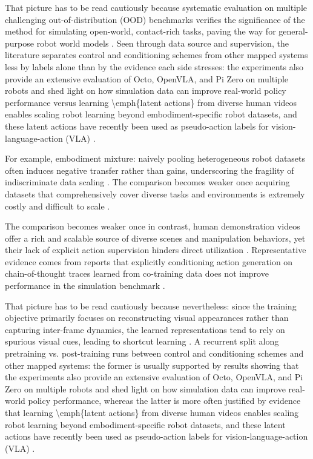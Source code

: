 \documentclass[a4paper,11pt]{article}
\begin{document}
That picture has to be read cautiously because systematic evaluation on multiple challenging out-of-distribution (OOD) benchmarks verifies the significance of the method for simulating open-world, contact-rich tasks, paving the way for general-purpose robot world models \citep{Gao2026Dreamdojo}. Seen through data source and supervision, the literature separates control and conditioning schemes from other mapped systems less by labels alone than by the evidence each side stresses: the experiments also provide an extensive evaluation of Octo, OpenVLA, and Pi Zero on multiple robots and shed light on how simulation data can improve real-world policy performance versus learning \textbackslash{}emph\{latent actions\} from diverse human videos enables scaling robot learning beyond embodiment-specific robot datasets, and these latent actions have recently been used as pseudo-action labels for vision-language-action (VLA) \citep{Jlg2025Robot,Lee2026Learning,Lin2026Systematic}.

For example, embodiment mixture: naively pooling heterogeneous robot datasets often induces negative transfer rather than gains, underscoring the fragility of indiscriminate data scaling \citep{Wang2026Rethinking}. The comparison becomes weaker once acquiring datasets that comprehensively cover diverse tasks and environments is extremely costly and difficult to scale \citep{Dai2026Conla}.

The comparison becomes weaker once in contrast, human demonstration videos offer a rich and scalable source of diverse scenes and manipulation behaviors, yet their lack of explicit action supervision hinders direct utilization \citep{Dai2026Conla}. Representative evidence comes from reports that explicitly conditioning action generation on chain-of-thought traces learned from co-training data does not improve performance in the simulation benchmark \citep{Lin2026Systematic}.

That picture has to be read cautiously because nevertheless: since the training objective primarily focuses on reconstructing visual appearances rather than capturing inter-frame dynamics, the learned representations tend to rely on spurious visual cues, leading to shortcut learning \citep{Dai2026Conla}. A recurrent split along pretraining vs. post-training runs between control and conditioning schemes and other mapped systems: the former is usually supported by results showing that the experiments also provide an extensive evaluation of Octo, OpenVLA, and Pi Zero on multiple robots and shed light on how simulation data can improve real-world policy performance, whereas the latter is more often justified by evidence that learning \textbackslash{}emph\{latent actions\} from diverse human videos enables scaling robot learning beyond embodiment-specific robot datasets, and these latent actions have recently been used as pseudo-action labels for vision-language-action (VLA) \citep{Jlg2025Robot,Lee2026Learning,Lin2026Systematic}.
\end{document}
